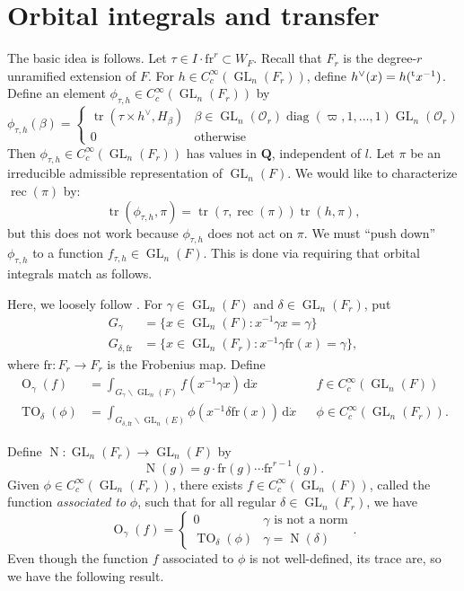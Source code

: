 \documentclass{article}
\DeclareMathOperator{\GL}{GL}
\DeclareMathOperator{\norm}{N}
\DeclareMathOperator{\orbital}{O}
\DeclareMathOperator{\reciprocity}{rec}
\DeclareMathOperator{\trace}{tr}
\DeclareMathOperator{\twistedorbital}{TO}
\newcommand{\frob}{\mathrm{fr}} %
\newcommand{\transpose}[1]{\prescript{\mathrm{t}}{}{#1}}
\newcommand{\cO}{\mathcal{O}}
\newcommand{\dQ}{\mathbf{Q}}
\begin{document}
\section{Orbital integrals and transfer}

The basic idea is follows. Let $\tau\in I\cdot \frob^r\subset W_F$. Recall 
that $F_r$ is the degree-$r$ unramified extension of $F$. For 
$h\in C_c^\infty(\GL_n(F_r))$, define $h^\vee(x) = h(\transpose x^{-1})$. 
Define an element $\phi_{\tau,h}\in C_c^\infty(\GL_n(F_r))$ by 
\begin{equation*}\tag{$\ast$}\label{eq:fun-def}
  \phi_{\tau,h}(\beta) = \begin{cases} \trace(\tau\times h^\vee,H_\beta) & \beta\in \GL_n(\cO_r)\operatorname{diag}(\varpi,1,\dots,1)\GL_n(\cO_r) \\ 0 & \text{otherwise} \end{cases}
\end{equation*}
Then $\phi_{\tau,h}\in C_c^\infty(\GL_n(F_r))$ has values in $\dQ$, independent 
of $l$. Let $\pi$ be an irreducible admissible representation of $\GL_n(F)$. 
We would like to characterize $\reciprocity(\pi)$ by: 
\[
  \trace(\phi_{\tau,h},\pi) = \trace(\tau,\reciprocity(\pi))\trace(h,\pi) ,
\]
but this does not work because $\phi_{\tau,h}$ does not act on $\pi$. We must 
``push down'' $\phi_{\tau,h}$ to a function $f_{\tau,h}\in \GL_n(F)$. This is 
done via requiring that orbital integrals match as follows. 

Here, we loosely follow \cite[1.3]{arthur-clozel-1989}. For 
$\gamma\in \GL_n(F)$ and $\delta\in \GL_n(F_r)$, put 
\begin{align*}
  G_\gamma &= \{x\in \GL_n(F):x^{-1} \gamma x = \gamma\} \\
  G_{\delta,\frob} &= \{x\in \GL_n(F_r):x^{-1} \gamma \frob(x) = \gamma\} ,
\end{align*}
where $\frob:F_r\to F_r$ is the Frobenius map. Define 
\begin{align*}
  \orbital_\gamma(f) 
    &= \int_{G_\gamma\backslash \GL_n(F)} f(x^{-1} \gamma x)\, \mathrm{d} \dot x && f\in C_c^\infty(\GL_n(F)) \\ 
  \twistedorbital_\delta(\phi) 
    &= \int_{G_{\delta,\frob}\backslash \GL_n(E)} \phi(x^{-1} \delta \frob(x))\, \mathrm{d}\dot x && \phi\in C_c^\infty(\GL_n(F_r)) .
\end{align*}

Define $\norm:\GL_n(F_r)\to \GL_n(F)$ by 
\[
  \norm(g) = g\cdot \frob(g)\dotsm \frob^{r-1}(g) .
\]
Given $\phi\in C_c^\infty(\GL_n(F_r))$, there exists 
$f\in C_c^\infty(\GL_n(F))$, called the function \emph{associated to} $\phi$, 
such that for all regular $\delta\in \GL_n(F_r)$, we have 
\[
  \orbital_\gamma(f) = 
  \begin{cases} 
    0 & \gamma\text{ is not a norm} \\ 
    \twistedorbital_\delta(\phi) & \gamma=\norm(\delta)
  \end{cases} .
\]
Even though the function $f$ associated to $\phi$ is not well-defined, 
its trace are, so we have the following result. 
\end{document}
